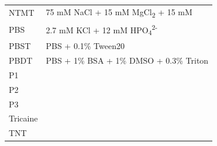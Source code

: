\documentclass[11pt,singlespacinge,twoside]{reedthesis} %
\begin{document}
\begin{longtable}[]{@{}ll@{}}
\begin{minipage}[t]{0.26\columnwidth}
NTMT\strut
\end{minipage} & \begin{minipage}[t]{0.68\columnwidth}\raggedright
75 mM NaCl + 15 mM MgCl\textsubscript{2} + 15 mM\strut
\end{minipage}\tabularnewline
\begin{minipage}[t]{0.26\columnwidth}\raggedright
PBS\strut
\end{minipage} & \begin{minipage}[t]{0.68\columnwidth}\raggedright
2.7 mM KCl + 12 mM HPO\textsubscript{4}\textsuperscript{2-}\strut
\end{minipage}\tabularnewline
\begin{minipage}[t]{0.26\columnwidth}\raggedright
PBST\strut
\end{minipage} & \begin{minipage}[t]{0.68\columnwidth}\raggedright
PBS + 0.1\% Tween20\strut
\end{minipage}\tabularnewline
\begin{minipage}[t]{0.26\columnwidth}\raggedright
PBDT\strut
\end{minipage} & \begin{minipage}[t]{0.68\columnwidth}\raggedright
PBS + 1\% BSA + 1\% DMSO + 0.3\% Triton\strut
\end{minipage}\tabularnewline
\begin{minipage}[t]{0.26\columnwidth}\raggedright
P1\strut
\end{minipage} & \begin{minipage}[t]{0.68\columnwidth}\raggedright
\strut
\end{minipage}\tabularnewline
\begin{minipage}[t]{0.26\columnwidth}\raggedright
P2\strut
\end{minipage} & \begin{minipage}[t]{0.68\columnwidth}\raggedright
\strut
\end{minipage}\tabularnewline
\begin{minipage}[t]{0.26\columnwidth}\raggedright
P3\strut
\end{minipage} & \begin{minipage}[t]{0.68\columnwidth}\raggedright
\strut
\end{minipage}\tabularnewline
\begin{minipage}[t]{0.26\columnwidth}\raggedright
Tricaine\strut
\end{minipage} & \begin{minipage}[t]{0.68\columnwidth}\raggedright
\strut
\end{minipage}\tabularnewline
\begin{minipage}[t]{0.26\columnwidth}\raggedright
TNT\strut
\end{minipage} & \begin{minipage}[t]{0.68\columnwidth}\raggedright
\strut
\end{minipage}\tabularnewline
\bottomrule
\end{longtable}
\end{document}
